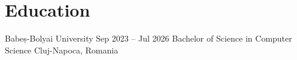\section{Education}
\resumeSubHeadingListStart

\resumeSubheading
{Babeș-Bolyai University}
{Sep 2023 -- Jul 2026}
{Bachelor of Science in Computer Science}
{Cluj-Napoca, Romania}
\resumeItemListStart
{}

\resumeItemListEnd


\resumeSubHeadingListEnd
